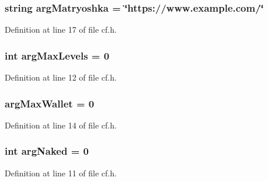 \subsubsection[{\texorpdfstring{arg\+Matryoshka}{argMatryoshka}}]{\setlength{\rightskip}{0pt plus 5cm}string arg\+Matryoshka = \char`\"{}https\+://www.\+example.\+com/\char`\"{}}\hypertarget{class_k_1_1_c_f_a9e868129a03788dd992ba0e7548a6ea9}{}\label{class_k_1_1_c_f_a9e868129a03788dd992ba0e7548a6ea9}


Definition at line 17 of file cf.\+h.

\subsubsection[{\texorpdfstring{arg\+Max\+Levels}{argMaxLevels}}]{\setlength{\rightskip}{0pt plus 5cm}int arg\+Max\+Levels = 0}\hypertarget{class_k_1_1_c_f_ab055f0fe04365bf08537040c5ba9d3ef}{}\label{class_k_1_1_c_f_ab055f0fe04365bf08537040c5ba9d3ef}


Definition at line 12 of file cf.\+h.

\subsubsection[{\texorpdfstring{arg\+Max\+Wallet}{argMaxWallet}}]{ arg\+Max\+Wallet = 0}\hypertarget{class_k_1_1_c_f_a6ba243e087d2134aa546907459589dbb}{}\label{class_k_1_1_c_f_a6ba243e087d2134aa546907459589dbb}


Definition at line 14 of file cf.\+h.

\subsubsection[{\texorpdfstring{arg\+Naked}{argNaked}}]{\setlength{\rightskip}{0pt plus 5cm}int arg\+Naked = 0}\hypertarget{class_k_1_1_c_f_a3717f53c2ee309adbb6eec21c1d162c4}{}\label{class_k_1_1_c_f_a3717f53c2ee309adbb6eec21c1d162c4}


Definition at line 11 of file cf.\+h.

